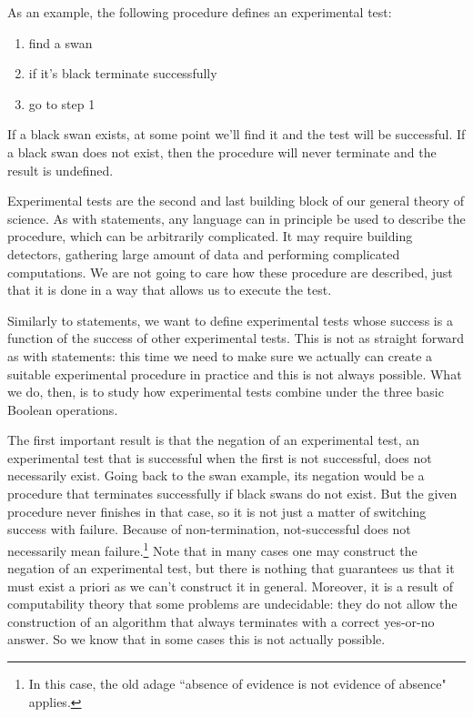 \documentclass[11pt,letterpaper,fleqn]{memoir} %
\begin{document}
As an example, the following procedure defines an experimental test:
\begin{enumerate}
	\item find a swan
	\item if it's black terminate successfully
	\item go to step 1
\end{enumerate}
If a black swan exists, at some point we'll find it and the test will be successful. If a black swan does not exist, then the procedure will never terminate and the result is undefined.

Experimental tests are the second and last building block of our general theory of science. As with statements, any language can in principle be used to describe the procedure, which can be arbitrarily complicated. It may require building detectors, gathering large amount of data and performing complicated computations. We are not going to care how these procedure are described, just that it is done in a way that allows us to execute the test.

Similarly to statements, we want to define experimental tests whose success is a function of the success of other experimental tests. This is not as straight forward as with statements: this time we need to make sure we actually can create a suitable experimental procedure in practice and this is not always possible. What we do, then, is to study how experimental tests combine under the three basic Boolean operations.

The first important result is that the negation of an experimental test, an experimental test that is successful when the first is not successful, does not necessarily exist. Going back to the swan example, its negation would be a procedure that terminates successfully if black swans do not exist. But the given procedure never finishes in that case, so it is not just a matter of switching success with failure. Because of non-termination, not-successful does not necessarily mean failure.\footnote{In this case, the old adage ``absence of evidence is not evidence of absence" applies.} Note that in many cases one may construct the negation of an experimental test, but there is nothing that guarantees us that it must exist a priori as we can't construct it in general. Moreover, it is a result of computability theory that some problems are undecidable: they do not allow the construction of an algorithm that always terminates with a correct yes-or-no answer. So we know that in some cases this is not actually possible.
\end{document}
